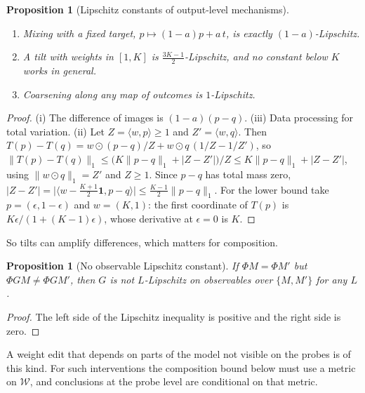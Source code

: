 \documentclass[11pt]{article}
\newtheorem{proposition}[theorem]{Proposition}
\theoremstyle{definition}
\theoremstyle{remark}
\newcommand{\cW}{\mathcal{W}}
\begin{document}
\begin{proposition}[Lipschitz constants of output-level mechanisms]\label{prop:lipschitz}
\leavevmode
\begin{enumerate}[label=(\roman*)]
\item Mixing with a fixed target, $p\mapsto(1-a)p+a\,t$, is exactly $(1-a)$-Lipschitz.
\item A tilt with weights in $[1,K]$ is $\tfrac{3K-1}{2}$-Lipschitz, and no constant below $K$ works in
  general.
\item Coarsening along any map of outcomes is $1$-Lipschitz.
\end{enumerate}
\end{proposition}
\begin{proof}
(i) The difference of images is $(1-a)(p-q)$. (iii) Data processing for total variation. (ii) Let
$Z=\langle w,p\rangle\ge1$ and $Z'=\langle w,q\rangle$. Then
$T(p)-T(q)=w\odot(p-q)/Z+w\odot q\,(1/Z-1/Z')$, so
$\lVert T(p)-T(q)\rVert_1\le\big(K\lVert p-q\rVert_1+\lvert Z-Z'\rvert\big)/Z\le K\lVert
p-q\rVert_1+\lvert Z-Z'\rvert$, using $\lVert w\odot q\rVert_1=Z'$ and $Z\ge1$. Since $p-q$ has total mass zero,
$\lvert Z-Z'\rvert=\lvert\langle w-\tfrac{K+1}2\mathbf 1,p-q\rangle\rvert\le\tfrac{K-1}2\lVert
p-q\rVert_1$. For the lower bound take $p=(\epsilon,1-\epsilon)$ and $w=(K,1)$: the first coordinate
of $T(p)$ is $K\epsilon/(1+(K-1)\epsilon)$, whose derivative at $\epsilon=0$ is $K$.
\end{proof}

So tilts can amplify differences, which matters for composition.

\begin{proposition}[No observable Lipschitz constant]\label{prop:nonfaithful}
If $\Phi M=\Phi M'$ but $\Phi GM\ne\Phi GM'$, then $G$ is not $L$-Lipschitz on observables over
$\{M,M'\}$ for any $L$.
\end{proposition}
\begin{proof}
The left side of the Lipschitz inequality is positive and the right side is zero.
\end{proof}

A weight edit that depends on parts of the model not visible on the probes is of this kind. For such
interventions the composition bound below must use a metric on $\cW$, and conclusions at the probe
level are conditional on that metric.
\end{document}
